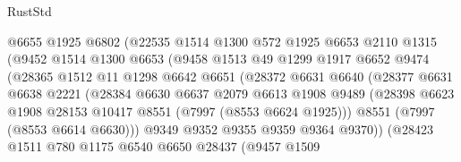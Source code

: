 \begin{lexlean}{RustStd}
\begin{coremodule}
{\begin{coremodule}
{{{{{{{{{{{{{{{{{{{{{{{{{{{{{{{{{{{{{{{{{{{                        @6655
                        @1925
                        @6802
                        (@22535
                          @1514
                          @1300
                          @572
                          @1925
                          @6653
                          @2110
                          @1315
                          (@9452
                            @1514
                            @1300
                            @6653
                            (@9458
                              @1513
                              @49
                              @1299
                              @1917
                              @6652
                              @9474
                              (@28365
                                @1512
                                @11
                                @1298
                                @6642
                                @6651
                                (@28372
                                  @6631
                                  @6640
                                  (@28377
                                    @6631
                                    @6638
                                    @2221
                                    (@28384
                                      @6630
                                      @6637
                                      @2079
                                      @6613
                                      @1908
                                      @9489
                                      (@28398
                                        @6623
                                        @1908
                                        @28153
                                        @10417
                                        @8551
                                        (@7997 (@8553 @6624 @1925)))
                                      @8551
                                      (@7997 (@8553 @6614 @6630)))
                                    @9349
                                    @9352
                                    @9355
                                    @9359
                                    @9364
                                    @9370))
                                (@28423
                                  @1511
                                  @780
                                  @1175
                                  @6540
                                  @6650
                                  @28437
                                  (@9457
                                    @1509
}}}}}}}}}}}}}}}}}}}}}}}}}}}}}}}}}}}}}}}}}}}
\end{coremodule}}
\end{coremodule}
\end{lexlean}
